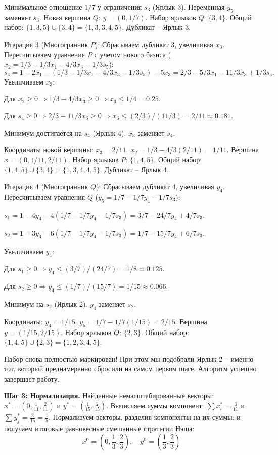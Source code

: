 Минимальное отношение $1/7$ у ограничения $s_3$ (Ярлык 3). Переменная $y_5$ заменяет $s_3$.
Новая вершина $Q$: $y = (0, 1/7)$. Набор ярлыков $Q$: $\{3, 4\}$.
Общий набор: $\{1, 3, 5\} \cup \{3, 4\} = \{1, 3, 3, 4, 5\}$. Дубликат – Ярлык 3.

Итерация 3 (Многогранник $P$): Сбрасываем дубликат 3, увеличивая $x_3$. 
Пересчитываем уравнения $P$ с учетом нового базиса ($x_2 = 1/3 - 1/3x_1 - 4/3x_3 - 1/3s_5$):
$$
s_4 = 1 - 2x_1 - (1/3 - 1/3x_1 - 4/3x_3 - 1/3s_5) - 5x_3 = 2/3 - 5/3x_1 - 11/3x_3 + 1/3s_5.
$$
Увеличиваем $x_3$:

Для $x_2 \ge 0 \Rightarrow 1/3 - 4/3x_3 \ge 0 \Rightarrow x_3 \le 1/4 = 0.25$.

Для $s_4 \ge 0 \Rightarrow 2/3 - 11/3x_3 \ge 0 \Rightarrow x_3 \le (2/3)/(11/3) = 2/11 \approx 0.181$.

Минимум достигается на $s_4$ (Ярлык 4). $x_3$ заменяет $s_4$.

Координаты новой вершины: $x_3 = 2/11$. $x_2 = 1/3 - 4/3(2/11) = 1/11$. Вершина $x = (0, 1/11, 2/11)$.
Набор ярлыков $P$: $\{1, 4, 5\}$. Общий набор: $\{1, 4, 5\} \cup \{3, 4\} = \{1, 3, 4, 4, 5\}$. Дубликат – Ярлык 4.

Итерация 4 (Многогранник $Q$): Сбрасываем дубликат 4, увеличивая $y_4$.
Пересчитываем уравнения $Q$ ($y_5 = 1/7 - 1/7y_4 - 1/7s_3$):

$s_1 = 1 - 4y_4 - 4(1/7 - 1/7y_4 - 1/7s_3) = 3/7 - 24/7y_4 + 4/7s_3$.

$s_2 = 1 - 3y_4 - 6(1/7 - 1/7y_4 - 1/7s_3) = 1/7 - 15/7y_4 + 6/7s_3$.

Увеличиваем $y_4$:

Для $s_1 \ge 0 \Rightarrow y_4 \le (3/7)/(24/7) = 1/8 \approx 0.125$.

Для $s_2 \ge 0 \Rightarrow y_4 \le (1/7)/(15/7) = 1/15 \approx 0.066$.

Минимум на $s_2$ (Ярлык 2). $y_4$ заменяет $s_2$.

Координаты: $y_4 = 1/15$. $y_5 = 1/7 - 1/7(1/15) = 2/15$. Вершина $y = (1/15, 2/15)$.
Набор ярлыков $Q$: $\{2, 3\}$. Общий набор: $\{1, 4, 5\} \cup \{2, 3\} = \{1, 2, 3, 4, 5\}$.

Набор снова полностью маркирован! При этом мы подобрали Ярлык 2 – именно тот, который преднамеренно сбросили на самом первом шаге. Алгоритм успешно завершает работу.

\textbf{Шаг 3: Нормализация.}
Найденные немасштабированные векторы: $x^* = (0, \frac{1}{11}, \frac{2}{11})$ и $y^* = (\frac{1}{15}, \frac{2}{15})$.
Вычисляем суммы компонент: $\sum x^*_i = \frac{3}{11}$ и $\sum y^*_j = \frac{3}{15} = \frac{1}{5}$.
Нормализуем векторы, разделив компоненты на их суммы, и получаем итоговые равновесные смешанные стратегии Нэша:
$$x^0 = \left(0, \frac{1}{3}, \frac{2}{3}\right), \quad y^0 = \left(\frac{1}{3}, \frac{2}{3}\right)$$


